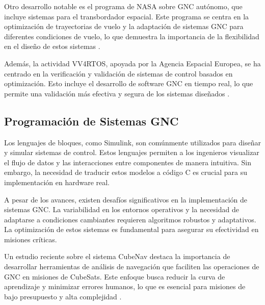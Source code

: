 Otro desarrollo notable es el programa de NASA sobre GNC autónomo, que incluye sistemas para el transbordador espacial. Este programa se centra en la optimización 
de trayectorias de vuelo y la adaptación de sistemas GNC para diferentes condiciones de vuelo, lo que demuestra la importancia de la flexibilidad en el diseño de 
estos sistemas \cite{Bordano1991AutonomousGN}.

Además, la actividad VV4RTOS, apoyada por la Agencia Espacial Europea, se ha centrado en la verificación y validación de sistemas de control basados en optimización. 
Esto incluye el desarrollo de software GNC en tiempo real, lo que permite una validación más efectiva y segura de los sistemas diseñados \cite{Loureno2023VerificationV}.

\subsection{Programación de Sistemas GNC}
Los lenguajes de bloques, como Simulink, son comúnmente utilizados para diseñar y simular sistemas de control. Estos lenguajes permiten a los ingenieros visualizar 
el flujo de datos y las interacciones entre componentes de manera intuitiva. Sin embargo, la necesidad de traducir estos modelos a código C es crucial para su 
implementación en hardware real.

A pesar de los avances, existen desafíos significativos en la implementación de sistemas GNC. La variabilidad en los entornos operativos y la necesidad de adaptarse 
a condiciones cambiantes requieren algoritmos robustos y adaptativos. La optimización de estos sistemas es fundamental para asegurar su efectividad en misiones 
críticas.

Un estudio reciente sobre el sistema CubeNav destaca la importancia de desarrollar herramientas de análisis de navegación que faciliten las operaciones de GNC 
en misiones de CubeSats. Este enfoque busca reducir la curva de aprendizaje y minimizar errores humanos, lo que es esencial para misiones de bajo presupuesto 
y alta complejidad \cite{Loureno2023VerificationV}.